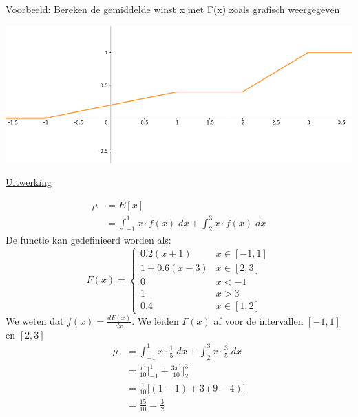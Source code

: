 \documentclass[12pt]{report}
\newcommand{\example}[2]{
      \hrulefill
      
      Voorbeeld: #1
      
      \underline{Uitwerking}
      
      #2
      
      \hrulefill
  }
\begin{document}
\example{Bereken de gemiddelde winst x met F(x) zoals grafisch weergegeven 
\begin{center}
 \includegraphics[width=0.5\linewidth]{slide_7}
\end{center}

}{
\begin{equation*}
 \begin{split}
  \mu & = E[x] \\
      & = \int_{-1}^{1} x\cdot f(x)\; dx + \int_{2}^{3} x\cdot f(x)\; dx
 \end{split}
\end{equation*}
De functie kan gedefinieerd worden als:
$$F(x) = \begin{cases}
   0.2(x + 1) & x \in [-1,1] \\
   1 + 0.6(x-3) & x \in [2,3] \\
   0 & x < -1 \\
   1 & x > 3 \\
   0.4 & x \in [1, 2]
\end{cases}$$
We weten dat $f(x) = \frac{dF(x)}{dx}$. We leiden $F(x)$ af voor de intervallen $[-1, 1]$ en $[2, 3]$ 
\begin{equation*}
      \begin{split}
       \mu & = \int_{-1}^{1} x\cdot \frac{1}{5}\; dx + \int_{2}^{3} x\cdot \frac{3}{5}\; dx \\
           & = \frac{x^2}{10}\bigg|_{-1}^{1} + \frac{3x^2}{10}\bigg|_{2}^{3} \\
           & = \frac{1}{10}\bigg[(1 - 1) + 3(9 - 4)      \bigg] \\
           & = \frac{15}{10} = \frac{3}{2}
      \end{split}
\end{equation*}
}
\end{document}
